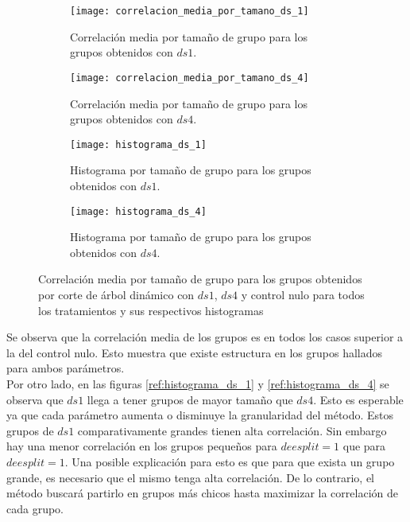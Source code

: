\begin{figure*}[t!]
    \centering
    \begin{subfigure}[t]{0.45\textwidth}
    \centering
    \texttt{[image: correlacion\_media\_por\_tamano\_ds\_1]}
    \caption{Correlación media por tamaño de grupo para los grupos obtenidos con $ds1$.}
    \label{fig:correlacion_media_por_tamano_ds_1}
    \end{subfigure}
    \begin{subfigure}[t]{0.45\textwidth}
    \centering
    \texttt{[image: correlacion\_media\_por\_tamano\_ds\_4]}
    \caption{Correlación media por tamaño de grupo para los grupos obtenidos con $ds4$.}
    \label{fig:correlacion_media_por_tamano_ds_4}
    \end{subfigure}
    \centering
    \begin{subfigure}[t]{0.45\textwidth}
    \centering
    \texttt{[image: histograma\_ds\_1]}
    \caption{Histograma por tamaño de grupo para los grupos obtenidos con $ds1$.}
    \label{fig:histograma_ds_1}
    \end{subfigure}
    \begin{subfigure}[t]{0.45\textwidth}
    \centering
    \texttt{[image: histograma\_ds\_4]}
    \caption{Histograma por tamaño de grupo para los grupos obtenidos con $ds4$.}
    \label{fig:histograma_ds_4}
    \end{subfigure}    
    \caption{Correlación media por tamaño de grupo para los grupos obtenidos por corte de árbol dinámico con $ds1$, $ds4$ y control nulo para todos los tratamientos y sus respectivos histogramas}
\end{figure*}
Se observa que la correlación media de los grupos es en todos los casos superior a la del control nulo. Esto muestra que existe estructura en los grupos hallados para ambos parámetros. \\
Por otro lado, en las figuras \ref{ref:histograma_ds_1} y \ref{ref:histograma_ds_4} se observa que $ds1$ llega a tener grupos de mayor tamaño que $ds4$. Esto es esperable ya que cada parámetro aumenta o disminuye la granularidad del método. Estos grupos de $ds1$ comparativamente grandes tienen alta correlación. Sin embargo hay una menor correlación en los grupos pequeños para $deesplit=1$ que para $deesplit=1$. Una posible explicación para esto es que para que exista un grupo grande, es necesario que el mismo tenga alta correlación. De lo contrario, el método buscará partirlo en grupos más chicos hasta maximizar la correlación de cada grupo.\\

